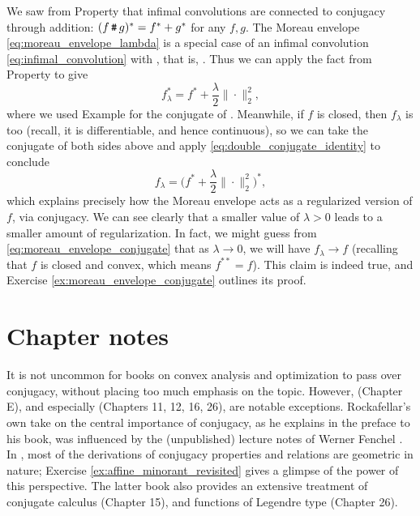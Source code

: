 We saw from Property  that infimal
convolutions are connected to conjugacy through addition: $(f \operatorname{\texttt{\#}} g)^* =
f^* + g^*$ for any $f,g$. The Moreau envelope \eqref{eq:moreau_envelope_lambda}
is a special case of an infimal convolution \eqref{eq:infimal_convolution} with
, that is, . Thus we can apply the fact from
Property  to give 
\[
f_\lambda^* = f^* + \frac{\lambda}{2} \|\cdot\|_2^2,
\]
where we used Example  for the conjugate of
. Meanwhile, if $f$ is closed, then
$f_\lambda$ is too (recall, it is differentiable, and hence continuous), so we
can take the conjugate of both sides above and apply
\eqref{eq:double_conjugate_identity} to conclude   
\begin{equation}
\label{eq:moreau_envelope_conjugate}
f_\lambda = \bigg( f^* + \frac{\lambda}{2} \|\cdot\|_2^2 \bigg)^*,
\end{equation}
which explains precisely how the Moreau envelope acts as a regularized version 
of $f$, via conjugacy. We can see clearly that a smaller value of $\lambda>0$
leads to a smaller amount of regularization. In fact, we might guess from 
\eqref{eq:moreau_envelope_conjugate} that as $\lambda \to 0$, we will have  
$f_\lambda\to f$ (recalling that $f$ is closed and convex, which means $f^{**} =
f$). This claim is indeed true, and Exercise \ref{ex:moreau_envelope_conjugate}
outlines its proof.    

\SkipTocEntry\section*{Chapter notes}

It is not uncommon for books on convex analysis and optimization to pass over
conjugacy, without placing too much emphasis on the topic. However,
\cite{hiriartUrruty2001fundamentals} (Chapter E), and especially
\cite{rockafellar1970convex} (Chapters 11, 12, 16, 26), are notable
exceptions. Rockafellar's own take on the central importance of conjugacy, as he 
explains in the preface to his book, was influenced by the (unpublished) lecture 
notes of Werner Fenchel \cite{fenchel1951convex}. In
\cite{rockafellar1970convex}, most of the derivations of conjugacy properties 
and relations are geometric in nature; Exercise
\ref{ex:affine_minorant_revisited} gives a glimpse of the power of this
perspective. The latter book also provides an extensive treatment of conjugate
calculus (Chapter 15), and functions of Legendre type (Chapter 26).

